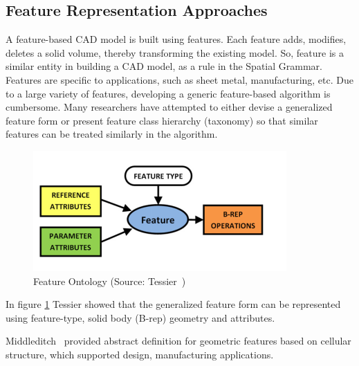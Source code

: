 \subsection{Feature Representation Approaches}

A feature-based CAD model is built using features. Each feature adds, modifies, deletes a solid volume, thereby transforming the existing model. So, feature is a similar entity in building a CAD model, as a rule in the Spatial Grammar. Features are specific to applications, such as sheet metal, manufacturing, etc. Due to a large variety of features, developing a generic feature-based algorithm is cumbersome. Many researchers have attempted to either devise a generalized feature form or present feature class hierarchy (taxonomy) so that similar features can be treated similarly in the algorithm. 



	\begin{figure}[!h]
	\centering
	\includegraphics[width=0.5\linewidth]{../Common/images/OntologyTessier}
	\caption{Feature Ontology (Source: Tessier~\cite{Tessier2013})}
	\label{fig:litsurvey:Tessier}
	\end{figure}



	  
In figure \ref{fig:litsurvey:Tessier} Tessier showed that the generalized feature form can be represented using feature-type, solid body (B-rep) geometry and attributes. 
	  
Middleditch~\cite{Middleditch1997} provided abstract definition for geometric features based on cellular structure, which supported design, manufacturing applications. 

